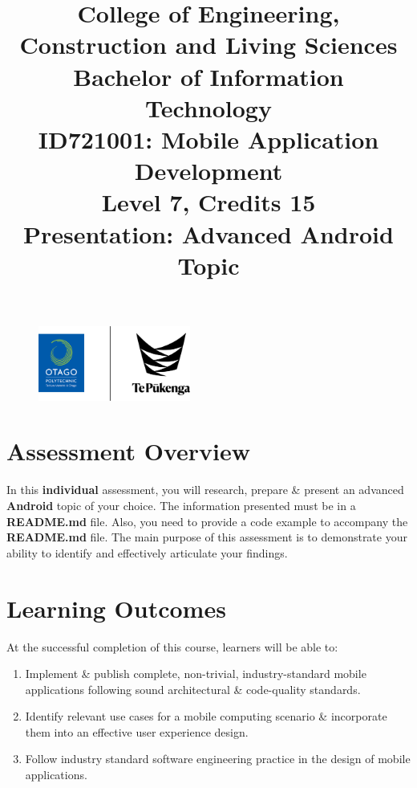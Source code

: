 \documentclass{article}
\author{}
\begin{document}
\begin{figure}
	\centering
	\includegraphics[width=50mm]{../../resources/img/logo.png}
\end{figure} 

\title{College of Engineering, Construction and Living Sciences\\Bachelor of Information Technology\\ID721001: Mobile Application Development\\Level 7, Credits 15\\\textbf{Presentation: Advanced Android Topic}}
\date{}
\maketitle

\section*{Assessment Overview}
In this \textbf{individual} assessment, you will research, prepare \& present an advanced \textbf{Android} topic of your choice. The information presented must be in a \textbf{README.md} file. Also, you need to provide a code example to accompany the \textbf{README.md} file. The main purpose of this assessment is to demonstrate your ability to identify and effectively articulate your findings.

\section*{Learning Outcomes}
At the successful completion of this course, learners will be able to:
\begin{enumerate}
	\item Implement \& publish complete, non-trivial, industry-standard mobile applications following sound architectural \& code-quality standards.
	\item Identify relevant use cases for a mobile computing scenario \& incorporate them into an effective user experience design.
	\item Follow industry standard software engineering practice in the design of mobile applications.
\end{enumerate}
\end{document}
